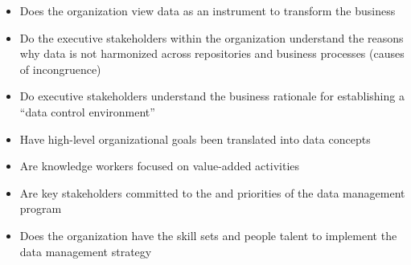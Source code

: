 \begin{description}[nosep,font=\bfseries]
  \begin{itemize}
    \item Does the organization view data as an instrument to transform the business
    \item Do the executive stakeholders within the organization understand the reasons why data is not harmonized across repositories and business processes (causes of incongruence)
    \item Do executive stakeholders understand the business rationale for establishing a “data control environment”
    \item Have high-level organizational goals been translated into data concepts
    \item Are knowledge workers focused on value-added activities
    \item Are key stakeholders committed to the  and priorities of the data management program
    \item Does the organization have the skill sets and people talent to implement the data management strategy
  \end{itemize}

\end{description}










